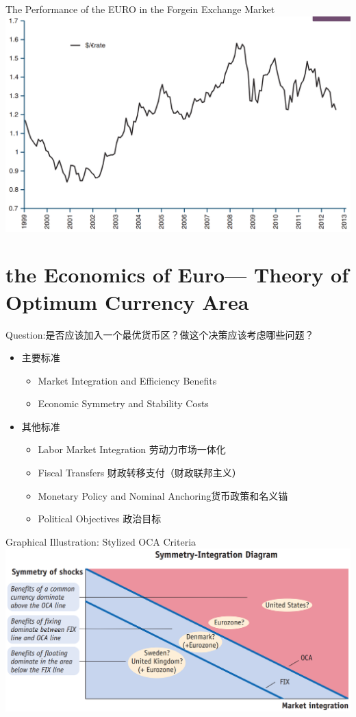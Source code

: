 \documentclass[10pt,hyperref={CJKbookmarks=true},xcolor=dvipsnames,aspectratio=169]{beamer}
\begin{document}
\begin{frame}{The Performance of the EURO in the Forgein Exchange Market}
		\centering
\includegraphics[scale=0.3]{fig/euro/euro}
\end{frame}

\section{the Economics of Euro--- Theory of Optimum Currency Area }
Question:是否应该加入一个最优货币区？做这个决策应该考虑哪些问题？
\begin{itemize}
	\item 主要标准
	\begin{itemize}
		\item Market Integration and Efficiency Benefits 
		\item Economic Symmetry and Stability Costs
	\end{itemize}
	\item 其他标准 
		\begin{itemize}
		\item Labor Market Integration 劳动力市场一体化
		\item Fiscal Transfers 财政转移支付（财政联邦主义）
		\item Monetary Policy and Nominal Anchoring货币政策和名义锚 
		\item Political Objectives 政治目标
	\end{itemize}
\end{itemize}

\begin{frame}{Graphical Illustration: Stylized OCA Criteria}
\centering
\includegraphics[scale=0.45]{fig/euro/oca2}
\end{frame}
\end{document}

